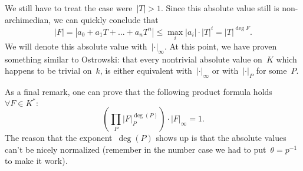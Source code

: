 We still have to treat the case were~$|T| > 1$. Since this absolute value still is non-archimedian, we can quickly conclude that~
\begin{equation}
  |F| = |a_0 + a_1 T + \ldots + a_n T^n| \leq \max_i |a_i|\cdot |T|^i = |T|^{\deg F} .
\end{equation}
We will denote this absolute value with~$|\cdot|_\infty$. At this point, we have proven something similar to Ostrowski: that every nontrivial absolute value on~$K$ which happens to be trivial on~$k$, is either equivalent with~$|\cdot|_\infty$ or with~$|\cdot|_P$ for some~$P$.

As a final remark, one can prove that the following product formula holds~$\forall F \in K^*:$
\begin{equation}
  \left( \prod_{P} |F|_P^{\deg(P)} \right) \cdot |F|_\infty =1 .
\end{equation}
The reason that the exponent~$\deg(P)$ shows up is that the absolute values can't be nicely normalized (remember in the number case we had to put~$\theta = p^{-1}$ to make it work).
